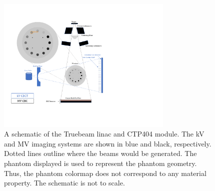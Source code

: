 


\begin{figure}[h!]
  \begin{center}
  \includegraphics[width=0.75\textwidth,trim={1cm 4cm 9.5cm 2cm}, clip]{figures/setup_figure.pdf}
  \caption{
  A schematic of the Truebeam linac and CTP404 module. The kV and MV imaging systems are shown in blue and black, respectively. Dotted lines outline where the beams would be generated. The phantom displayed is used to represent the phantom geometry. Thus, the phantom colormap does not correspond to any material property. The schematic is not to scale. 
  \label{fig_setup_val} 
    }  %
    \end{center}
\end{figure}


